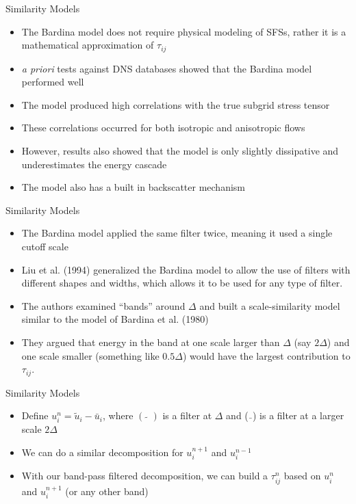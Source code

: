 
\begin{frame}{Similarity Models}
\begin{itemize}
	\item The Bardina model does not require physical modeling of SFSs, rather it is a mathematical approximation of $\tau_{ij}$
	\item \textit{a priori} tests against DNS databases showed that the Bardina model performed well
	\item The model produced high correlations with the true subgrid stress tensor
	\item These correlations occurred for both isotropic and anisotropic flows
	\item However, results also showed that the model is only slightly dissipative and underestimates the energy cascade
	\item The model also has a built in backscatter mechanism
\end{itemize}

\end{frame}


\begin{frame}{Similarity Models}
\begin{itemize}
	\item The Bardina model applied the same filter twice, meaning it used a single cutoff scale
	\item Liu et al. (1994) generalized the Bardina model to allow the use of filters with different shapes and widths, which allows it to be used for any type of filter.
	\item The authors examined ``bands'' around $\Delta$ and built a scale-similarity model similar to the model of Bardina et al. (1980)
	\item They argued that energy in the band at one scale larger than $\Delta$ (say $2\Delta$) and one scale  smaller (something like $0.5\Delta$) would have the largest contribution to $\tau_{ij}$.
\end{itemize}
\end{frame}


\begin{frame}{Similarity Models}
\begin{itemize}
	\item Define $u_i^n = \widetilde{u}_i - \bar u_i$, where $(\widetilde{\ \ \ })$ is a filter at $\Delta$ and ($\bar{\ \ }$) is a filter at a larger scale $2\Delta$
	\item We can do a similar decomposition for $u_i^{n+1}$ and $u_i^{n-1}$
	\item With our band-pass filtered decomposition, we can build a $\tau_{ij}^n$ based on $u_i^n$ and $u_i^{n+1}$ (or any other band)
\end{itemize}

\end{frame}

